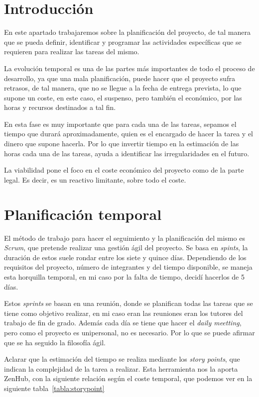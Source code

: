 
\section{Introducción}
En este apartado trabajaremos sobre la planificación del proyecto, de tal manera que se pueda definir, identificar y programar las actividades específicas que se requieren para realizar las tareas del mismo. 

La evolución temporal es una de las partes más importantes de todo el proceso de desarrollo, ya que una mala planificación, puede hacer que el proyecto sufra retrasos, de tal manera, que no se llegue a la fecha de entrega prevista, lo que supone un coste, en este caso, el suspenso, pero también el económico, por las horas y recursos destinados a tal fin.

 En esta fase es muy importante que para cada una de las tareas, sepamos el tiempo que durará aproximadamente, quien es el encargado de hacer la tarea y el dinero que supone hacerla. Por lo que invertir tiempo en la estimación de las horas cada una de las tareas, ayuda a identificar las irregularidades en el futuro.

La viabilidad pone el foco en el coste económico del proyecto como de la parte legal. Es decir, es un reactivo limitante, sobre todo el coste.

\section{Planificación temporal}
El método de trabajo para hacer el seguimiento y la planificación del mismo es \emph{Scrum}, que pretende realizar una gestión ágil del proyecto. Se basa en \emph{spints}, la duración de estos suele rondar entre los siete y quince días. Dependiendo de los requisitos del proyecto, número de integrantes y del tiempo disponible, se maneja esta horquilla temporal, en mi caso por la falta de tiempo, decidí hacerlos de 5 días. 

Estos \emph{sprints} se basan en una reunión, donde se planifican todas las tareas que se tiene como objetivo realizar, en mi caso eran las reuniones eran los tutores del trabajo de fin de grado. Además cada día se tiene que hacer el \emph{daily meetting}, pero como el proyecto es unipersonal, no es necesario. Por lo que se puede afirmar que se ha seguido la filosofía ágil.

Aclarar que la estimación del tiempo se realiza mediante los \emph{story points}, que indican la complejidad de la tarea a realizar. Esta herramienta nos la aporta ZenHub, con la siguiente relación según el coste temporal, que podemos ver en la siguiente tabla~\ref{tabla:storypoint}

